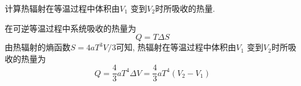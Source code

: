 \begin{problem}[2.15]
计算热辐射在等温过程中体积由$V_1$ 变到$V_2$时所吸收的热量.
\end{problem}
\begin{solution}
在可逆等温过程中系统吸收的热量为
\[
Q = T\Delta S
\]
由热辐射的熵函数$S=4aT^3V/3$可知, 热辐射在等温过程中体积由$V_1$ 变到$V_2$时所吸收的热量为
\[
Q = \frac{4}{3}aT^4\Delta V = \frac{4}{3}aT^4 (V_2-V_1) 
\]
\end{solution}
